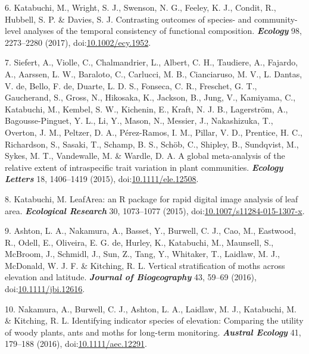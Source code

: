 \documentclass[
]{article}
\newenvironment{cslreferences}%
  {}%
  {\par}
\begin{document}
\begin{cslreferences}
\leavevmode\hypertarget{ref-Katabuchi2017}{}%
6. Katabuchi, M., Wright, S. J., Swenson, N. G., Feeley, K. J., Condit,
R., Hubbell, S. P. \& Davies, S. J. Contrasting outcomes of species- and
community-level analyses of the temporal consistency of functional
composition. \emph{\textbf{Ecology}} 98, 2273--2280 (2017),
doi:\href{https://doi.org/10.1002/ecy.1952}{10.1002/ecy.1952}.

\leavevmode\hypertarget{ref-Siefert2015}{}%
7. Siefert, A., Violle, C., Chalmandrier, L., Albert, C. H., Taudiere,
A., Fajardo, A., Aarssen, L. W., Baraloto, C., Carlucci, M. B.,
Cianciaruso, M. V., L. Dantas, V. de, Bello, F. de, Duarte, L. D. S.,
Fonseca, C. R., Freschet, G. T., Gaucherand, S., Gross, N., Hikosaka,
K., Jackson, B., Jung, V., Kamiyama, C., Katabuchi, M., Kembel, S. W.,
Kichenin, E., Kraft, N. J. B., Lagerström, A., Bagousse-Pinguet, Y. L.,
Li, Y., Mason, N., Messier, J., Nakashizuka, T., Overton, J. M.,
Peltzer, D. A., Pérez-Ramos, I. M., Pillar, V. D., Prentice, H. C.,
Richardson, S., Sasaki, T., Schamp, B. S., Schöb, C., Shipley, B.,
Sundqvist, M., Sykes, M. T., Vandewalle, M. \& Wardle, D. A. A global
meta-analysis of the relative extent of intraspecific trait variation in
plant communities. \emph{\textbf{Ecology Letters}} 18, 1406--1419
(2015), doi:\href{https://doi.org/10.1111/ele.12508}{10.1111/ele.12508}.

\leavevmode\hypertarget{ref-Katabuchi2015}{}%
8. Katabuchi, M. LeafArea: an R package for rapid digital image analysis
of leaf area. \emph{\textbf{Ecological Research}} 30, 1073--1077 (2015),
doi:\href{https://doi.org/10.1007/s11284-015-1307-x}{10.1007/s11284-015-1307-x}.

\leavevmode\hypertarget{ref-Ashton2016}{}%
9. Ashton, L. A., Nakamura, A., Basset, Y., Burwell, C. J., Cao, M.,
Eastwood, R., Odell, E., Oliveira, E. G. de, Hurley, K., Katabuchi, M.,
Maunsell, S., McBroom, J., Schmidl, J., Sun, Z., Tang, Y., Whitaker, T.,
Laidlaw, M. J., McDonald, W. J. F. \& Kitching, R. L. Vertical
stratification of moths across elevation and latitude.
\emph{\textbf{Journal of Biogeography}} 43, 59--69 (2016),
doi:\href{https://doi.org/10.1111/jbi.12616}{10.1111/jbi.12616}.

\leavevmode\hypertarget{ref-Nakamura2016}{}%
10. Nakamura, A., Burwell, C. J., Ashton, L. A., Laidlaw, M. J.,
Katabuchi, M. \& Kitching, R. L. Identifying indicator species of
elevation: Comparing the utility of woody plants, ants and moths for
long-term monitoring. \emph{\textbf{Austral Ecology}} 41, 179--188
(2016), doi:\href{https://doi.org/10.1111/aec.12291}{10.1111/aec.12291}.


\end{cslreferences}
\end{document}
